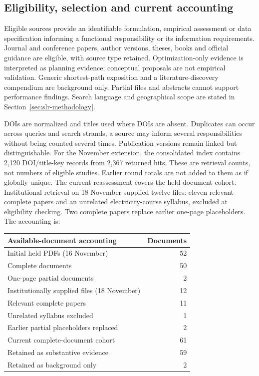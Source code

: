 \subsection{Eligibility, selection and current accounting}\label{app:selection}
Eligible sources provide an identifiable formulation, empirical assessment or
data specification informing a functional responsibility or its information
requirements. Journal and conference papers,
author versions, theses, books and official guidance are eligible, with source
type retained. Optimization-only evidence is interpreted as planning evidence;
conceptual proposals are not empirical validation. Generic shortest-path
exposition and a literature-discovery compendium are background only. Partial
files and abstracts cannot support performance findings. Search language and
geographical scope are stated in Section~\ref{sec:slr-methodology}.

DOIs are normalized and titles used where DOIs are absent. Duplicates can occur
across queries and search strands; a source may inform several responsibilities
without being
counted several times. Publication versions remain linked but distinguishable.
For the November extension, the consolidated index contains 2,120 DOI/title-key
records from 2,367 returned hits. These are retrieval counts, not numbers of
eligible studies. Earlier round totals are not added to them as if globally
unique. The current reassessment covers the held-document cohort. Institutional retrieval
on 18 November supplied twelve files: eleven relevant complete papers and an
unrelated electricity-course syllabus, excluded at eligibility checking. Two
complete papers replace earlier one-page placeholders. The accounting is:

\begin{center}
\begin{tabular}{lr}
\toprule
Available-document accounting & Documents \\
\midrule
Initial held PDFs (16 November) & 52 \\
\quad Complete documents & 50 \\
\quad One-page partial documents & 2 \\
Institutionally supplied files (18 November) & 12 \\
\quad Relevant complete papers & 11 \\
\quad Unrelated syllabus excluded & 1 \\
Earlier partial placeholders replaced & 2 \\
Current complete-document cohort & 61 \\
\quad Retained as substantive evidence & 59 \\
\quad Retained as background only & 2 \\
\bottomrule
\end{tabular}
\end{center}


